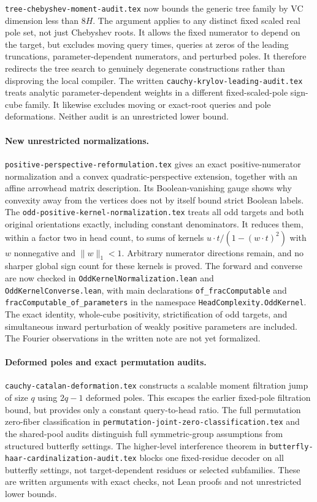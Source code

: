 \documentclass[11pt]{article}
\begin{document}
\texttt{tree-chebyshev-moment-audit.tex} now bounds the generic tree
family by VC dimension less than $8H$. The argument applies to any
distinct fixed scaled real pole set, not just Chebyshev roots. It allows
the fixed numerator to depend on the target, but excludes moving query
times, queries at zeros of the leading truncations, parameter-dependent
numerators, and perturbed poles. It therefore redirects the tree search
to genuinely degenerate constructions rather than disproving the local
compiler. The written \texttt{cauchy-krylov-leading-audit.tex} treats
analytic parameter-dependent weights in a different fixed-scaled-pole
sign-cube family. It likewise excludes moving or exact-root queries
and pole deformations. Neither audit is an unrestricted lower bound.

\paragraph{New unrestricted normalizations.}
\texttt{positive-perspective-reformulation.tex} gives an exact
positive-numerator normalization and a convex quadratic-perspective
extension, together with an affine arrowhead matrix description.
Its Boolean-vanishing gauge shows why convexity away from the vertices
does not by itself bound strict Boolean labels. The
\texttt{odd-positive-kernel-normalization.tex} treats all odd targets
and both original orientations exactly, including constant denominators.
It reduces them, within a factor two in head count, to sums of kernels
$u\cdot t/(1-(w\cdot t)^2)$ with $w$ nonnegative and
$\|w\|_1<1$. Arbitrary numerator directions remain, and no sharper
global sign count for these kernels is proved. The forward and converse
are now checked in \texttt{OddKernelNormalization.lean} and
\texttt{OddKernelConverse.lean}, with main declarations
\texttt{of\_fracComputable} and \texttt{fracComputable\_of\_parameters}
in the namespace \texttt{HeadComplexity.OddKernel}. The exact identity,
whole-cube positivity, strictification of odd targets, and simultaneous
inward perturbation of weakly positive parameters are included.
The Fourier observations in the written note are not yet formalized.

\paragraph{Deformed poles and exact permutation audits.}
\texttt{cauchy-catalan-deformation.tex} constructs a scalable moment
filtration jump of size $q$ using $2q-1$ deformed poles. This escapes
the earlier fixed-pole filtration bound, but provides only a constant
query-to-head ratio. The full permutation zero-fiber classification in
\texttt{permutation-joint-zero-classification.tex} and the shared-pool
audits distinguish full symmetric-group assumptions from structured
butterfly settings. The higher-level interference theorem in
\texttt{butterfly-haar-cardinalization-audit.tex} blocks one fixed-residue
decoder on all butterfly settings, not target-dependent residues or
selected subfamilies. These are written arguments with exact checks,
not Lean proofs and not unrestricted lower bounds.
\end{document}

